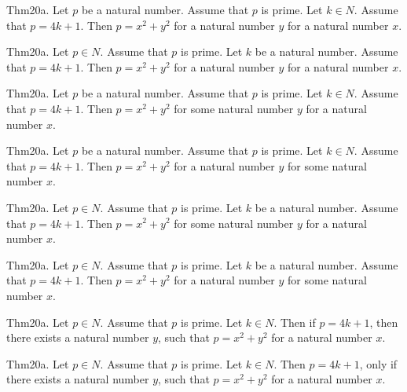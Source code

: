 \documentclass{article}
\begin{document}
Thm20a. Let $p$ be a natural number. Assume that $p$ is prime. Let $k \in N$. Assume that $p = 4 k + 1$. Then $p = x ^{ 2}+ y ^{ 2}$ for a natural number $y$ for a natural number $x$.

Thm20a. Let $p \in N$. Assume that $p$ is prime. Let $k$ be a natural number. Assume that $p = 4 k + 1$. Then $p = x ^{ 2}+ y ^{ 2}$ for a natural number $y$ for a natural number $x$.

Thm20a. Let $p$ be a natural number. Assume that $p$ is prime. Let $k \in N$. Assume that $p = 4 k + 1$. Then $p = x ^{ 2}+ y ^{ 2}$ for some natural number $y$ for a natural number $x$.

Thm20a. Let $p$ be a natural number. Assume that $p$ is prime. Let $k \in N$. Assume that $p = 4 k + 1$. Then $p = x ^{ 2}+ y ^{ 2}$ for a natural number $y$ for some natural number $x$.

Thm20a. Let $p \in N$. Assume that $p$ is prime. Let $k$ be a natural number. Assume that $p = 4 k + 1$. Then $p = x ^{ 2}+ y ^{ 2}$ for some natural number $y$ for a natural number $x$.

Thm20a. Let $p \in N$. Assume that $p$ is prime. Let $k$ be a natural number. Assume that $p = 4 k + 1$. Then $p = x ^{ 2}+ y ^{ 2}$ for a natural number $y$ for some natural number $x$.

Thm20a. Let $p \in N$. Assume that $p$ is prime. Let $k \in N$. Then if $p = 4 k + 1$, then there exists a natural number $y$, such that $p = x ^{ 2}+ y ^{ 2}$ for a natural number $x$.

Thm20a. Let $p \in N$. Assume that $p$ is prime. Let $k \in N$. Then $p = 4 k + 1$, only if there exists a natural number $y$, such that $p = x ^{ 2}+ y ^{ 2}$ for a natural number $x$.
\end{document}
